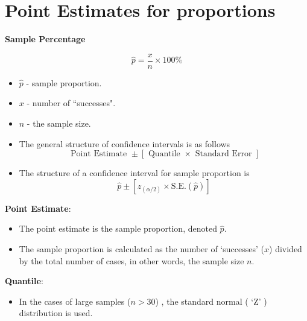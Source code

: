 \documentclass[]{report}
\begin{document}

\section{Point Estimates for proportions }
\textbf{Sample Percentage}

\[
\hat{p} = \frac{x}{n} \times 100\%
\]

\begin{itemize}
\item $\hat{p}$ - sample proportion.
\item $x$  - number of ``successes".
\item $n$  - the sample size.
\end{itemize}


\begin{itemize}
\item The general structure of confidence intervals is as follows
\[ \mbox{ Point Estimate } \pm \left[ \mbox{ Quantile } \times \mbox{ Standard Error } \right] \]
\item The structure of a confidence interval for sample proportion is
\[ \hat{p} \pm \left[ z_{(\alpha/2)} \times \mbox{S.E.}(\hat{p}) \right]\]


\end{itemize}



\textbf{Point Estimate}:\\
\begin{itemize}
\item The point estimate is the sample proportion, denoted $\hat{p}$.  
\item The sample proportion is calculated as the number of `successes' ($x$) divided by the total number of cases, in other words, the sample size $n$.

\end{itemize}

\noindent \textbf{Quantile}:\\
\begin{itemize}
\item In the cases of large samples ($ n > 30$) , the standard normal ( `Z' ) distribution is used.
\end{itemize}
\end{document}
